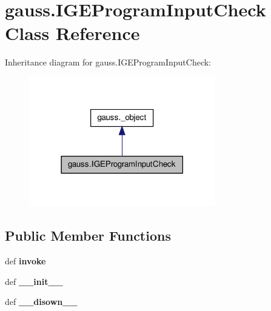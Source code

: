 \hypertarget{classgauss_1_1_i_g_e_program_input_check}{\section{gauss.\-I\-G\-E\-Program\-Input\-Check Class Reference}
\label{classgauss_1_1_i_g_e_program_input_check}
}


Inheritance diagram for gauss.\-I\-G\-E\-Program\-Input\-Check\-:\nopagebreak
\begin{figure}[H]
\begin{center}
\leavevmode
\includegraphics[width=230pt]{classgauss_1_1_i_g_e_program_input_check__inherit__graph}
\end{center}
\end{figure}
\subsection*{Public Member Functions}
\begin{DoxyCompactItemize}
\item 
\hypertarget{classgauss_1_1_i_g_e_program_input_check_a96dc7d433aadc924ef66c27dd151aae7}{def {\bfseries invoke}}\label{classgauss_1_1_i_g_e_program_input_check_a96dc7d433aadc924ef66c27dd151aae7}

\item 
\hypertarget{classgauss_1_1_i_g_e_program_input_check_afea1a2f5c027ede7f5ce042d2ee8cbb3}{def {\bfseries \-\_\-\-\_\-init\-\_\-\-\_\-}}\label{classgauss_1_1_i_g_e_program_input_check_afea1a2f5c027ede7f5ce042d2ee8cbb3}

\item 
\hypertarget{classgauss_1_1_i_g_e_program_input_check_a05cb00bcd1fa6a2da9333345bf3facd9}{def {\bfseries \-\_\-\-\_\-disown\-\_\-\-\_\-}}\label{classgauss_1_1_i_g_e_program_input_check_a05cb00bcd1fa6a2da9333345bf3facd9}

\end{DoxyCompactItemize}
